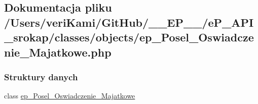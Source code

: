 \hypertarget{ep___posel___oswiadczenie___majatkowe_8php}{\subsection{Dokumentacja pliku /\-Users/veri\-Kami/\-Git\-Hub/\-\_\-\-\_\-\-E\-P\-\_\-\-\_\-/e\-P\-\_\-\-A\-P\-I\-\_\-srokap/classes/objects/ep\-\_\-\-Posel\-\_\-\-Oswiadczenie\-\_\-\-Majatkowe.php}
\label{ep___posel___oswiadczenie___majatkowe_8php}
}
\subsubsection*{Struktury danych}
\begin{DoxyCompactItemize}
\item 
class \hyperlink{classep___posel___oswiadczenie___majatkowe}{ep\-\_\-\-Posel\-\_\-\-Oswiadczenie\-\_\-\-Majatkowe}
\end{DoxyCompactItemize}
